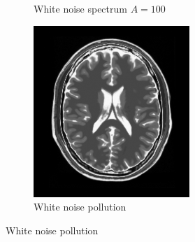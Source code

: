 \documentclass[UTF8]{ctexart}
\begin{document}
\begin{figure}[htbp]
\begin{subfigure}{0.3\textwidth}
        \caption{White noise spectrum $A=100$}
    \end{subfigure}%
    \hfill
    \begin{subfigure}{0.3\textwidth}
        \centering
        \includegraphics[width=\linewidth]{brain_noised_white.png}
        \caption{White noise pollution}
    \end{subfigure}


\end{figure}
\end{document}
